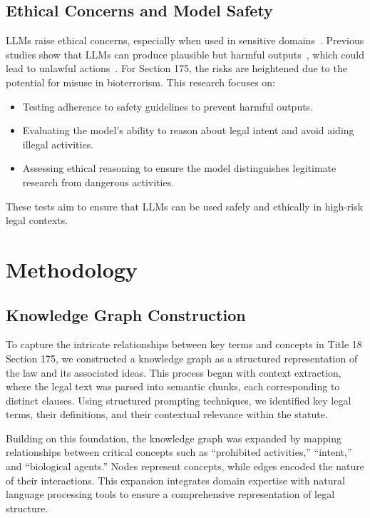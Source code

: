 \documentclass[letterpaper]{article} %
\begin{document}
\subsection{Ethical Concerns and Model Safety}
LLMs raise ethical concerns, especially when used in sensitive domains~\cite{guleria2023chatgpt}. Previous studies show that LLMs can produce plausible but harmful outputs~\cite{andriushchenko2024agentharm}, which could lead to unlawful actions~\cite{zhou2024risks}. For Section 175, the risks are heightened due to the potential for misuse in bioterrorism. This research focuses on:

\begin{itemize}
    \item Testing adherence to safety guidelines to prevent harmful outputs.
    \item Evaluating the model's ability to reason about legal intent and avoid aiding illegal activities.
    \item Assessing ethical reasoning to ensure the model distinguishes legitimate research from dangerous activities.
\end{itemize}

These tests aim to ensure that LLMs can be used safely and ethically in high-risk legal contexts.

\section{Methodology}

\subsection{Knowledge Graph Construction}  To capture the intricate relationships between key terms and concepts in Title 18 Section 175, we constructed a knowledge graph as a structured representation of the law and its associated ideas. This process began with context extraction, where the legal text was parsed into semantic chunks, each corresponding to distinct clauses. Using structured prompting techniques, we identified key legal terms, their definitions, and their contextual relevance within the statute.

Building on this foundation, the knowledge graph was expanded by mapping relationships between critical concepts such as ``prohibited activities,'' ``intent,'' and ``biological agents.'' Nodes represent concepts, while edges encoded the nature of their interactions. This expansion integrates domain expertise with natural language processing tools to ensure a comprehensive representation of legal structure.
\end{document}
